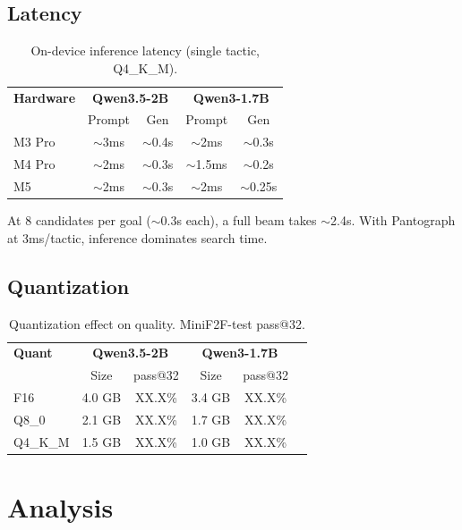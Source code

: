 \documentclass[11pt,a4paper]{article}
\begin{document}
\subsection{Latency}

\begin{table}[h]
\centering
\caption{On-device inference latency (single tactic, Q4\_K\_M).}
\begin{tabular}{lcccc}
\toprule
\textbf{Hardware} & \multicolumn{2}{c}{\textbf{Qwen3.5-2B}} & \multicolumn{2}{c}{\textbf{Qwen3-1.7B}} \\
 & Prompt & Gen & Prompt & Gen \\
\midrule
M3 Pro & $\sim$3ms & $\sim$0.4s & $\sim$2ms & $\sim$0.3s \\
M4 Pro & $\sim$2ms & $\sim$0.3s & $\sim$1.5ms & $\sim$0.2s \\
M5 & $\sim$2ms & $\sim$0.3s & $\sim$2ms & $\sim$0.25s \\
\bottomrule
\end{tabular}
\label{tab:latency}
\end{table}

At 8 candidates per goal ($\sim$0.3s each), a full beam takes $\sim$2.4s. With Pantograph at 3ms/tactic, inference dominates search time.

\subsection{Quantization}

\begin{table}[h]
\centering
\caption{Quantization effect on quality. MiniF2F-test pass@32.}
\begin{tabular}{lccccc}
\toprule
\textbf{Quant} & \multicolumn{2}{c}{\textbf{Qwen3.5-2B}} & \multicolumn{2}{c}{\textbf{Qwen3-1.7B}} \\
 & Size & pass@32 & Size & pass@32 \\
\midrule
F16 & 4.0 GB & XX.X\% & 3.4 GB & XX.X\% \\
Q8\_0 & 2.1 GB & XX.X\% & 1.7 GB & XX.X\% \\
Q4\_K\_M & 1.5 GB & XX.X\% & 1.0 GB & XX.X\% \\
\bottomrule
\end{tabular}
\label{tab:quant}
\end{table}

\section{Analysis}
\label{sec:analysis}
\end{document}
